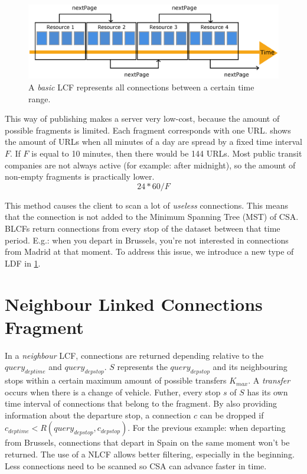 \documentclass[twocolumn]{phdsymp} %
\begin{document}
\begin{figure}[ht]
\begin{center}
	\includegraphics[width=.50\textwidth]{hypermediafragmenten}
	\caption{\label{hypermediafragmenten}A \textit{basic} LCF represents all connections between a certain time range.}
\end{center}
\end{figure}

This way of publishing makes a server very low-cost, because the amount of possible fragments is limited. Each fragment corresponds with one URL.
  shows the amount of URLs when all minutes of a day are spread by a fixed time interval $F$. If $F$ is equal to 10 minutes, then there would be 144 URLs. Most public transit companies are not always active (for example: after midnight), so the amount of non-empty fragments is practically lower.
\begin{equation} \label{lc:aantalurisoorspronkelijk}
24 * 60 / F
\end{equation}

This method causes the client to scan a lot of \textit{useless} connections. This means that the connection is not added to the Minimum Spanning Tree (MST) of CSA. BLCFs return connections from every stop of the dataset between that time period. E.g.: when you depart in Brussels, you're not interested in connections from Madrid at that moment.
To address this issue, we introduce a new type of LDF in \cref{nlcf}.

\section{Neighbour Linked Connections Fragment}
\label{nlcf}

In a \textit{neighbour} LCF, connections are returned depending relative to the $query_{deptime}$ and $query_{depstop}$. $S$ represents the $query_{depstop}$ and its neighbouring stops within a certain maximum amount of possible transfers $K_{max}$. A \textit{transfer} occurs when there is a change of vehicle. Futher, every stop $s$ of $S$ has its own time interval of connections that belong to the fragment.
By also providing information about the departure stop, a connection $c$ can be dropped if $c_{deptime} < R(query_{depstop}, c_{depstop})$. For the previous example: when departing from Brussels, connections that depart in Spain on the same moment won't be returned.
The use of a NLCF allows better filtering, especially in the beginning. Less connections need to be scanned so CSA can advance faster in time.
\end{document}
